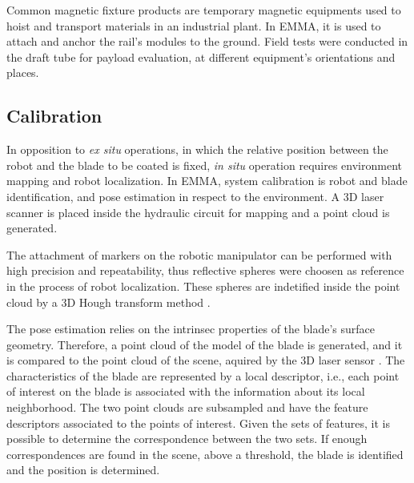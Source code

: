 Common magnetic fixture products are temporary magnetic equipments used to hoist
and transport materials in an industrial plant. In EMMA, it is used to attach
and anchor the rail's modules to the ground. Field tests were conducted in the
draft tube for payload evaluation, at different equipment's orientations and
places.


\subsection{Calibration}

In opposition to \textit{ex situ} operations, in which the relative position
between the robot and the blade to be coated is fixed, \textit{in situ}
operation requires environment mapping and robot localization. In
EMMA, system calibration is robot and blade identification, and pose estimation in
respect to the environment. A 3D laser scanner is placed inside the hydraulic
circuit for mapping and a point cloud is generated.
 
The attachment of markers on the robotic manipulator can be
performed with high precision and repeatability, thus reflective spheres were
choosen as reference in the process of robot localization. These spheres are indetified inside the point cloud by a 3D Hough
transform method \cite{camurri20143d}. 

The pose estimation relies on the intrinsec properties of the blade's
surface geometry. Therefore, a point cloud of the model of the blade is
generated, and it is compared to the point cloud of the scene, aquired by the 3D
laser sensor \cite{Tombari2010a}. The characteristics of the blade are represented by a local
descriptor, i.e., each point of interest on the blade is associated with the
information about its local neighborhood. The two point clouds are subsampled and have the
feature descriptors associated to the points of interest. Given the sets of features, 
it is possible to determine the correspondence between the two sets. If enough correspondences are found in
the scene, above a threshold, the blade is identified and the position is
determined.
